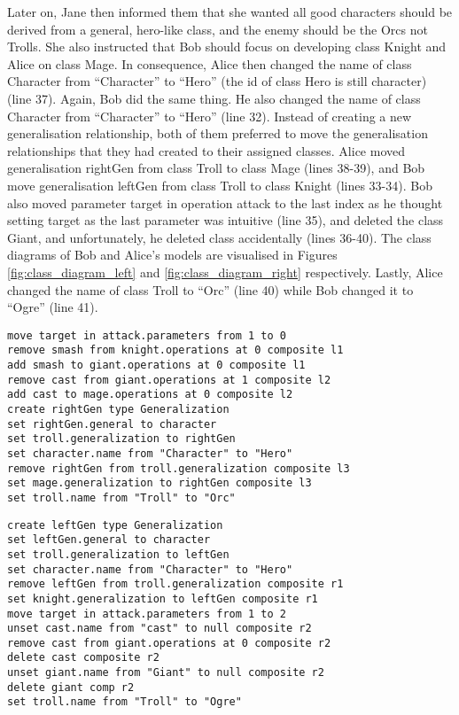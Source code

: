 Later on, Jane then informed them that she wanted all good characters should be derived from a general, hero-like class, and the enemy should be the Orcs not Trolls. She also instructed that Bob should focus on developing class \textsf{Knight} and Alice on class \textsf{Mage}. In consequence, Alice then changed the name of class \textsf{Character} from ``Character'' to ``Hero'' (the id of class \textsf{Hero} is still \textsf{character}) (line 37). Again, Bob did the same thing. He also changed the name of class \textsf{Character} from ``Character'' to ``Hero'' (line 32). Instead of creating a new generalisation relationship, both of them preferred to move the generalisation relationships that they had created to their assigned classes. Alice moved generalisation \textsf{rightGen} from class \textsf{Troll} to class \textsf{Mage} (lines 38-39), and Bob move generalisation \textsf{leftGen} from class \textsf{Troll} to class \textsf{Knight} (lines 33-34). Bob also moved parameter \textsf{target} in operation \textsf{attack} to the last index as he thought setting target as the last parameter was intuitive (line 35), and deleted the class {Giant}, and unfortunately, he deleted class  accidentally (lines 36-40). The class diagrams of Bob and Alice's models are visualised in Figures \ref{fig:class_diagram_left} and \ref{fig:class_diagram_right} respectively. Lastly, Alice changed the \textsf{name} of class \textsf{Troll} to ``Orc'' (line 40) while Bob changed it to ``Ogre'' (line 41).  

\vspace{-15pt}
\begin{lstlisting}[firstnumber=29,style=eol,caption={The appended events made by Alice to produce the right model in Fig. \ref{fig:class_diagram_right} (right version).},label=lst:cbp_right]
move target in attack.parameters from 1 to 0
remove smash from knight.operations at 0 composite l1
add smash to giant.operations at 0 composite l1
remove cast from giant.operations at 1 composite l2
add cast to mage.operations at 0 composite l2
create rightGen type Generalization
set rightGen.general to character
set troll.generalization to rightGen
set character.name from "Character" to "Hero"
remove rightGen from troll.generalization composite l3
set mage.generalization to rightGen composite l3
set troll.name from "Troll" to "Orc"
\end{lstlisting}

\vspace{-15pt}
\begin{lstlisting}[firstnumber=29,style=eol,caption={The appended events made by Bob to produce the left model in Fig. \ref{fig:class_diagram_left} (left version).},label=lst:cbp_left]
create leftGen type Generalization
set leftGen.general to character
set troll.generalization to leftGen
set character.name from "Character" to "Hero"
remove leftGen from troll.generalization composite r1
set knight.generalization to leftGen composite r1
move target in attack.parameters from 1 to 2
unset cast.name from "cast" to null composite r2
remove cast from giant.operations at 0 composite r2
delete cast composite r2
unset giant.name from "Giant" to null composite r2
delete giant comp r2
set troll.name from "Troll" to "Ogre"
\end{lstlisting}

